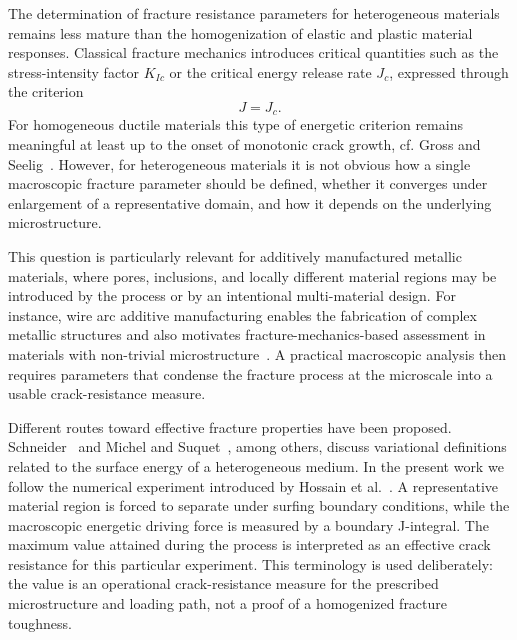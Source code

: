 \documentclass[pamm,a4paper,fleqn]{w-art}
\begin{document}
The determination of fracture resistance parameters for heterogeneous
materials remains less mature than the homogenization of elastic and
plastic material responses. Classical fracture mechanics introduces
critical
quantities such as the stress-intensity factor \(K_{Ic}\) or the
critical energy release rate \(J_c\), expressed through the criterion
\begin{equation}
  J = J_c.
  \label{eq:fracture_criterion_J}
\end{equation}
For homogeneous ductile materials this type of energetic criterion
remains meaningful at least up to the onset of monotonic crack
growth, cf. Gross and Seelig~\cite{gross_fracture_2011}. However, for
heterogeneous materials it is not obvious how a single
macroscopic fracture parameter should be defined, whether it
converges under enlargement of a representative domain, and how it
depends on the underlying microstructure.

This question is particularly relevant for additively manufactured
metallic materials, where pores, inclusions, and locally different
material regions may be introduced by the process or by an
intentional multi-material design. For instance,
wire arc additive manufacturing enables the fabrication of complex
metallic structures
and also motivates fracture-mechanics-based assessment in materials
with non-trivial microstructure~\cite{hauser_porosity_2021}. A
practical macroscopic analysis then requires parameters that condense
the fracture process at the microscale into a usable crack-resistance
measure.

Different routes toward effective fracture properties have been
proposed. Schneider~\cite{schneider_fftbased_2020} and Michel and
Suquet~\cite{michel_merits_2022}, among others, discuss variational
definitions related to the surface energy of a heterogeneous medium.
In the present work we follow the numerical experiment introduced by
Hossain et al.~\cite{hossain_effective_2014}. A representative
material region is forced to separate under surfing boundary
conditions, while the macroscopic energetic driving force is measured
by a boundary J-integral. The maximum value attained during the
process is interpreted as an effective crack resistance for this
particular experiment. This terminology is used deliberately: the
value is an operational crack-resistance measure for the prescribed
microstructure and loading path, not a proof of a homogenized
fracture toughness.
\end{document}
